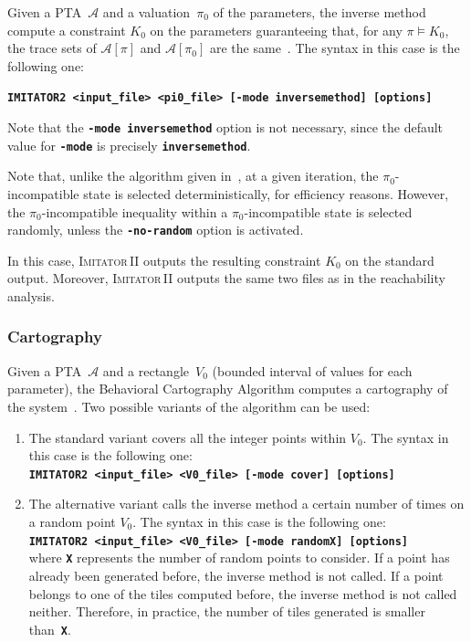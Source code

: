 \documentclass[a4paper,10pt]{article}
\newcommand{\A}{\mathcal{A}}
\newcommand{\imitatordeux}{\textsc{Imitator}\,II}
\newcommand{\imitatordeuxExec}{\code{IMITATOR2}}
\newcommand{\code}[1]{\textbf{\texttt{#1}}}
\begin{document}
Given a PTA~$\A$ and a valuation~$\pi_0$ of the parameters, the inverse method compute a constraint $K_0$ on the parameters guaranteeing that, for any $\pi \models K_0$, the trace sets of $\A[\pi]$ and $\A[\pi_0]$ are the same~\cite{acef09}.
The syntax in this case is the following one:

\code{\imitatordeuxExec{} <input\_file> <pi0\_file> [-mode inversemethod] [options]}

Note that the \code{-mode inversemethod} option is not necessary, since the default value for \code{-mode} is precisely \code{inversemethod}.

Note that, unlike the algorithm given in~\cite{acef09}, at a given iteration, the $\pi_0$-incompatible state is selected deterministically, for efficiency reasons.
However, the $\pi_0$-incompatible inequality within a $\pi_0$-incompatible state is selected randomly, unless the \code{-no-random} option is activated.

In this case, \imitatordeux{} outputs the resulting constraint $K_0$ on the standard output.
Moreover, \imitatordeux{} outputs the same two files as in the reachability analysis.


\subsubsection{Cartography} \label{ss:mode_cartography}

Given a PTA~$\A$ and a rectangle~$V_0$ (bounded interval of values for each parameter), the Behavioral Cartography Algorithm computes a cartography of the system~\cite{af10}.
Two possible variants of the algorithm can be used:
\begin{enumerate}
	\item The standard variant covers all the integer points within $V_0$.
	The syntax in this case is the following one:\\
	\code{\imitatordeuxExec{} <input\_file> <V0\_file> [-mode cover] [options]}

	\item The alternative variant calls the inverse method a certain number of times on a random point $V_0$.
	The syntax in this case is the following one:\\
	\code{\imitatordeuxExec{} <input\_file> <V0\_file> [-mode randomX] [options]}\\
	where \code{X} represents the number of random points to consider.
	If a point has already been generated before, the inverse method is not called.
	If a point belongs to one of the tiles computed before, the inverse method is not called neither.
	Therefore, in practice, the number of tiles generated is smaller than~\code{X}.
\end{enumerate}
\end{document}

